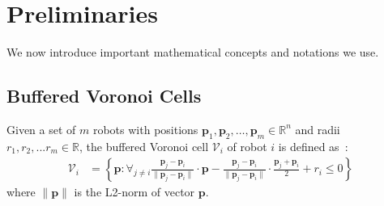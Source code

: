 \documentclass{svproc}
\newcommand{\vp}{\mathbf{p}}
\newcommand{\vf}{\mathbf{f}}
\newcommand{\vo}{\mathbf{o}}
\newcommand{\cV}{\mathcal{V}}
\newcommand{\cO}{\mathcal{O}}
\newcommand{\R}{\mathbb{R}} %
\begin{document}



\section{Preliminaries}

We now introduce important mathematical concepts and notations we use.

\subsection{Buffered Voronoi Cells} \label{bufferedVoronoi}
Given a set of $m$ robots with positions $\vp_1,\vp_2,\ldots,\vp_m \in \R^n$ and radii $r_1,r_2,...r_m \in \R$, the buffered Voronoi cell $\cV_i$ of robot $i$ is defined as~\cite{bufferedVoronoiCells}:
\begin{align}
    \cV_i &= \left\{\vp : \forall_{j\neq i} \frac{\vp_j-\vp_i}{\|\vp_j-\vp_i\|}\cdot \vp - \frac{\vp_j-\vp_i}{\|\vp_j-\vp_i\|}\cdot \frac{\vp_j+\vp_i}{2} + r_i\leq 0 \right\} \label{voronoi_cell_definition}
\end{align}
where $\|\vp\|$ is the L2-norm of vector $\vp$.
\end{document}

